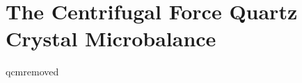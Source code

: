 \documentclass[a4paper,titlepage,onecolumn]{report}
\begin{document}
%
\part{The Centrifugal Force Quartz Crystal Microbalance}
{qcmremoved}
%



\end{document}
